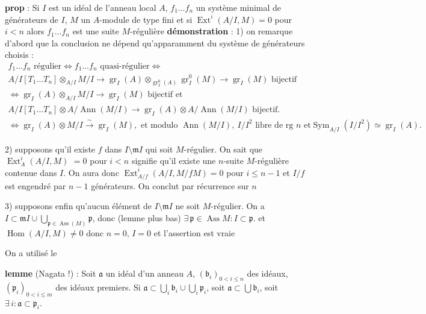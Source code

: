 \documentclass[11pt,a4paper]{article}
\begin{document}
\textbf{prop} : Si $I$ est un idéal de l'anneau local $A$, $f_1 \dots f_n$ un
système minimal de générateurs de $I$, $M$ un $A$-module de type fini et si
$\operatorname{Ext}^i(A/I, M) = 0$ pour $i < n$ alors $f_1 \dots f_n$ est une
suite $M$-régulière
\textbf{démonstration} : 1) on remarque d'abord que la conclusion ne dépend
qu'apparamment du système de générateurs choisis :
\begin{gather*}
  f_1 \dots f_n \text{ régulier} \Longleftrightarrow f_1 \dots f_n \text{ quasi-régulier} \Longleftrightarrow \\
  A/I[T_1 \dots T_n] \otimes_{A/I} M/I \to \operatorname{gr}_I(A) \otimes_{\operatorname{gr}^0_I(A)} \operatorname{gr}^0_I(M) \to \operatorname{gr}_I(M) \text{ bijectif} \\
  \Longleftrightarrow \operatorname{gr}_I(A) \otimes_{A/I} M/I \to \operatorname{gr}_I(M) \text{ bijectif et} \\
  A/I[T_1 \dots T_n] \otimes A/\operatorname{Ann}(M/I) \to \operatorname{gr}_I(A) \otimes A/\operatorname{Ann}(M/I) \text{ bijectif.} \\
  \Longleftrightarrow \operatorname{gr}_I(A) \otimes M/I \xrightarrow{\sim} \operatorname{gr}_I(M),
  \text{ et modulo } \operatorname{Ann}(M/I),\ I/I^2 \text{ libre de rg } n \text{ et}
  \operatorname{Sym}_{A/I}(I/I^2) \simeq \operatorname{gr}_I(A).
\end{gather*}

2) supposons qu'il existe $f$ dans $I \setminus \mathfrak{m} I$ qui soit
$M$-régulier. On sait que $\operatorname{Ext}^i_A(A/I, M)$ 
$= 0$ pour $i < n$ signifie qu'il existe une $n$-suite $M$-régulière contenue
dans $I$. On aura donc $\operatorname{Ext}^i_{A/f}(A/I, M/fM) = 0$ pour
$i \leqslant n-1$ et $I/f$ est engendré par $n-1$ générateurs. On conclut par
récurrence sur $n$

3) supposons enfin qu'aucun élément de $I \setminus \mathfrak{m} I$ ne soit
$M$-régulier. On a $I \subset \mathfrak{m} I \cup \bigcup_{\mathfrak{p} \in \operatorname{Ass}(M)} \mathfrak{p}$,
donc (lemme plus bas) $\exists\, \mathfrak{p} \in \operatorname{Ass} M : I \subset \mathfrak{p}$.
et $\operatorname{Hom}(A/I, M) \neq 0$ donc $n = 0$, $I = 0$ et l'assertion est
vraie

On a utilisé le

\textbf{lemme} (Nagata !) : Soit $\mathfrak{a}$ un idéal d'un anneau $A$,
$(\mathfrak{b}_i)_{0 < i \leqslant n}$ des idéaux,
$(\mathfrak{p}_i)_{0 < i \leqslant m}$ des idéaux premiers. Si
$\mathfrak{a} \subset \bigcup_i \mathfrak{b}_i \cup \bigcup_i \mathfrak{p}_i$,
soit $\mathfrak{a} \subset \bigcup \mathfrak{b}_i$, soit
$\exists\, i : \mathfrak{a} \subset \mathfrak{p}_i$.
\end{document}
